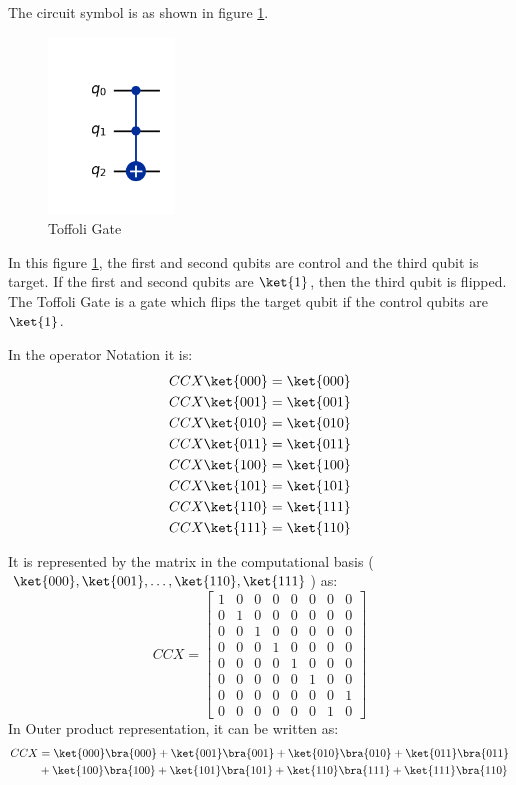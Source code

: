 \documentclass[12pt, oneside]{book}
\theoremstyle{definition}
\theoremstyle{definition}
\theoremstyle{remark}
\begin{document}
The circuit symbol is as shown in figure \ref{fig:toffoli}.
\begin{figure}[H]
    \centering
    \includegraphics[width=0.3\textwidth]{../images/ccx-gate.png}
    \caption{Toffoli Gate}
    \label{fig:toffoli}
\end{figure}
In this figure \ref{fig:toffoli}, the first and second qubits are control and the third qubit is target.
If the first and second qubits are $\ket{1}$, then the third qubit is flipped. The Toffoli Gate
is a gate which flips the target qubit if the control qubits are $\ket{1}$.

In the operator Notation it is:
\begin{align*}
    CCX\ket{000}&=\ket{000} \\
    CCX\ket{001}&=\ket{001} \\
    CCX\ket{010}&=\ket{010} \\
    CCX\ket{011}&=\ket{011} \\
    CCX\ket{100}&=\ket{100} \\
    CCX\ket{101}&=\ket{101} \\
    CCX\ket{110}&=\ket{111} \\
    CCX\ket{111}&=\ket{110}
\end{align*}

It is represented by the matrix in the computational basis 
($\ket{000},\ket{001},\ldots,\ket{110},\ket{111}$) as:
\[
    CCX=\begin{bmatrix}
        1 & 0 & 0 & 0 & 0 & 0 & 0 & 0 \\
        0 & 1 & 0 & 0 & 0 & 0 & 0 & 0 \\
        0 & 0 & 1 & 0 & 0 & 0 & 0 & 0 \\
        0 & 0 & 0 & 1 & 0 & 0 & 0 & 0 \\
        0 & 0 & 0 & 0 & 1 & 0 & 0 & 0 \\
        0 & 0 & 0 & 0 & 0 & 1 & 0 & 0 \\
        0 & 0 & 0 & 0 & 0 & 0 & 0 & 1 \\
        0 & 0 & 0 & 0 & 0 & 0 & 1 & 0
    \end{bmatrix}
\]
In Outer product representation, it can be written as:
\begin{align*}
    CCX&=\ket{000}\bra{000}+\ket{001}\bra{001}+\ket{010}\bra{010}+\ket{011}\bra{011} \\
    &+\ket{100}\bra{100}+\ket{101}\bra{101}+\ket{110}\bra{111}+\ket{111}\bra{110}
\end{align*}
\end{document}
